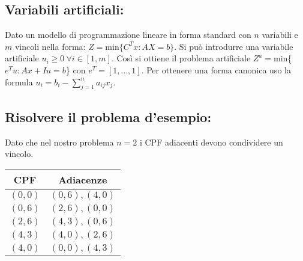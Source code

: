 \documentclass{article}
\begin{document}
\subsection{Variabili artificiali:}
Dato un modello di programmazione lineare in forma standard con $n$ variabili e $m$ vincoli nella forma: $Z=$min$\{C^Tx:AX=b\}$. Si può introdurre una variabile artificiale $u_i\ge0\ \forall i \in [1,m]$. Così si ottiene il problema artificiale $Z^a=$min\{$e^Tu:Ax+Iu=b$\} con $e^T=[1,\dots,1]$. Per ottenere una forma canonica uso la formula $u_i=b_i-\sum_{j=1}^{n}a_{ij}x_j$.


\subsection{Risolvere il problema d'esempio:}
\begin{minipage}{0.55\textwidth}
  Dato che nel nostro problema $n=2$ i CPF adiacenti devono condividere un vincolo.
\end{minipage}
\hfill
\begin{minipage}{0.30\textwidth}
  \begin{tabular}{|c|c|}
    \hline
    \textbf{CPF} & \textbf{Adiacenze} \\
    \hline
    $(0,0)$      & $(0,6),(4,0)$      \\
    $(0,6)$      & $(2,6),(0,0)$      \\
    $(2,6)$      & $(4,3),(0,6)$      \\
    $(4,3)$      & $(4,0),(2,6)$      \\
    $(4,0)$      & $(0,0),(4,3)$      \\
    \hline
  \end{tabular}
\end{minipage}
\end{document}
